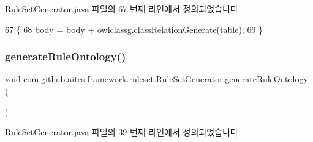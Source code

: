 Rule\+Set\+Generator.\+java 파일의 67 번째 라인에서 정의되었습니다.


\begin{DoxyCode}
67                                                      \{
68         \mbox{\hyperlink{classcom_1_1github_1_1aites_1_1framework_1_1ruleset_1_1_rule_set_generator_a1fbfa36b17c118b50f731278af7d8ae5}{body}} = \mbox{\hyperlink{classcom_1_1github_1_1aites_1_1framework_1_1ruleset_1_1_rule_set_generator_a1fbfa36b17c118b50f731278af7d8ae5}{body}}  + owlclassg.\mbox{\hyperlink{classcom_1_1github_1_1aites_1_1framework_1_1ruleset_1_1_o_w_l_class_generator_a4082d2b8575df9309689edeb347c115f}{classRelationGenerate}}(table);
69     \}
\end{DoxyCode}
\mbox{\label{classcom_1_1github_1_1aites_1_1framework_1_1ruleset_1_1_rule_set_generator_af33eca34b79f017e02f3304cd7a73b69}} 
\subsubsection{\texorpdfstring{generate\+Rule\+Ontology()}{generateRuleOntology()}}
{\footnotesize\ttfamily void com.\+github.\+aites.\+framework.\+ruleset.\+Rule\+Set\+Generator.\+generate\+Rule\+Ontology (\begin{DoxyParamCaption}{ }\end{DoxyParamCaption})}



Rule\+Set\+Generator.\+java 파일의 39 번째 라인에서 정의되었습니다.


